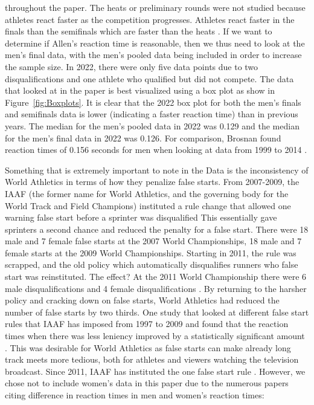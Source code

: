 \documentclass[12pt, letterpaper, titlepage]{article}
\begin{document}
throughout the paper.  The heats or preliminary rounds were not studied because
athletes react faster as the competition progresses.  Athletes react faster in
the finals than the semifinals which are faster than the heats 
\citep{zhang2021correlation}.  If we want to determine if Allen's reaction time
is reasonable, then we thus need to look at the men's final data, with the men's
pooled data being included in order to increase the sample size.  In 2022, there
were only five data points due to two disqualifications and one athlete who 
qualified but did not compete.
The data that looked at in the paper is best visualized using a box plot as show 
in Figure~\ref{fig:Boxplots}.  It is clear that the 2022 box plot for both the
men's finals and semifinals data is lower (indicating a faster reaction time)
than in previous years.  The median for the men's pooled data in 2022 was 0.129
and the median for the men's final data in 2022 was 0.126.  For comparison,
Brosnan found reaction times of 0.156 seconds for men when looking at data from
1999 to 2014 \citep{brosnan2017effects}.

Something that is extremely important to note in the Data is the inconsistency 
of World Athletics in terms of how they penalize false starts.  From 2007-2009,
the IAAF (the former name for World Athletics, and the governing body for the 
World Track and Field Champions) instituted a rule change that allowed one 
warning false start before a sprinter was disqualified \citep{iaaf2009falsestart}  This 
essentially gave sprinters a second chance and reduced the penalty for a false 
start.  There were 18 male and 7 female false starts at the 2007 World 
Championships, 18 male and 7 female starts at the 2009 World Championships. 
Starting in 2011, the rule was scrapped, and the old policy which automatically 
disqualifies runners who false start was reinstituted.  The effect? At the 2011 
World Championship there were 6 male disqualifications and 4 female 
disqualifications \citep{iaaf2009falsestart}. By returning to the harsher policy and 
cracking down on false starts, World Athletics had reduced the number of 
false starts by two thirds. One study that looked at different false start
rules that IAAF has imposed from 1997 to 2009 and found that the reaction 
times when there was less leniency improved by a statistically significant amount
\citep{haugen2013effect}. This was desirable for World Athletics as false starts can 
make already long track meets more tedious, both for athletes and viewers watching the 
television broadcast.  Since 2011, IAAF has instituted the one false start rule
\citep{iaaf2009falsestart}.  However, we chose not to include women's data in this
paper due to the numerous papers citing difference in reaction times in men and
women's reaction times: \citep{lipps2011implications, babicc2009reaction,
panoutsakopoulos2020gender}
\end{document}
